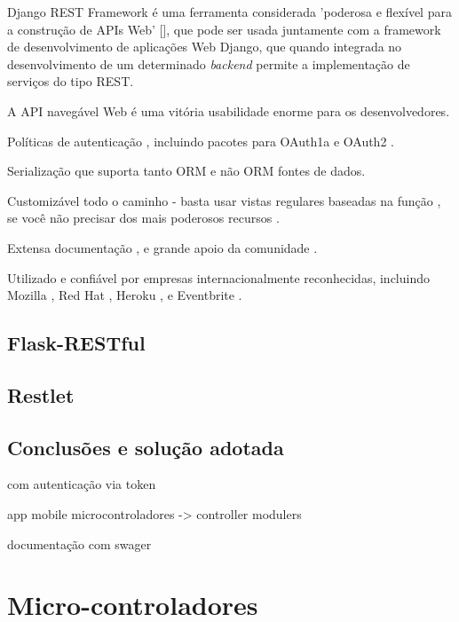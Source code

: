 Django REST Framework é uma ferramenta considerada 'poderosa e flexível para a construção de APIs Web' [], que pode ser usada juntamente com a framework de desenvolvimento de aplicações Web Django, que quando integrada no desenvolvimento de um determinado \textit{backend} permite a implementação de serviços do tipo REST.



A API navegável Web é uma vitória usabilidade enorme para os desenvolvedores.

Políticas de autenticação , incluindo pacotes para OAuth1a e OAuth2 .

Serialização que suporta tanto ORM e não ORM fontes de dados.

Customizável todo o caminho - basta usar vistas regulares baseadas na função , se você não  precisar dos mais poderosos recursos .

Extensa documentação , e grande apoio da comunidade .

Utilizado e confiável por empresas internacionalmente reconhecidas, incluindo Mozilla , 
Red Hat , Heroku , e Eventbrite .




\subsection{Flask-RESTful}


\subsection{Restlet}



\subsection{Conclusões e solução adotada}




com autenticação via token 







app mobile
microcontroladores -> controller modulers 


documentação com swager 





\newpage
\section{Micro-controladores}



